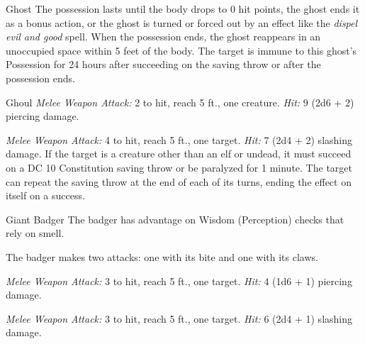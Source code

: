 \documentclass[10pt,a4paper,twoside,bg=print,twocolumn,openany,nodeprecatedcode]{dndbook}
\begin{document}
\begin{DndMonster}[float=t]{Ghost}
The possession lasts until the body drops to 0 hit points, the ghost ends it as a bonus action, or the ghost is turned or forced out by an effect like the \textit{dispel evil and good} spell. When the possession ends, the ghost reappears in an unoccupied space within 5 feet of the body. The target is immune to this ghost's Possession for 24 hours after succeeding on the saving throw or after the possession ends.

\end{DndMonster}



\begin{DndMonster}[float=t]{Ghoul}
\DndMonsterBasics[
armor-class = {12},
hit-points = {\DndDice{5d8}},
speed = {30 ft.}
]
\DndMonsterAbilityScores[
 str = 13,
 dex = 15,
 con = 10,
 int = 7,
 wis = 10,
 cha = 6
]
\DndMonsterDetails[
damage-immunities = {poison},
condition-immunities = {charmed, exhaustion, poisoned},
senses = {darkvision 60 ft., passive perception 10},
languages = {Common},
challenge = 1,
]
\textsl{Melee Weapon Attack:} 2 to hit, reach 5 ft., one creature. \textsl{Hit:} 9 (2d6 + 2) piercing damage.

\textsl{Melee Weapon Attack:} 4 to hit, reach 5 ft., one target. \textsl{Hit:} 7 (2d4 + 2) slashing damage. If the target is a creature other than an elf or undead, it must succeed on a DC 10 Constitution saving throw or be paralyzed for 1 minute. The target can repeat the saving throw at the end of each of its turns, ending the effect on itself on a success.

\end{DndMonster}



\begin{DndMonster}[float=t]{Giant Badger}
\DndMonsterBasics[
armor-class = {10},
hit-points = {\DndDice{2d8 + 4}},
speed = {30 ft., burrow 10 ft.}
]
\DndMonsterAbilityScores[
 str = 13,
 dex = 10,
 con = 15,
 int = 2,
 wis = 12,
 cha = 5
]
\DndMonsterDetails[
senses = {darkvision 30 ft., passive perception 11},
challenge = 1/4,
]
The badger has advantage on Wisdom (Perception) checks that rely on smell.

The badger makes two attacks: one with its bite and one with its claws.

\textsl{Melee Weapon Attack:} 3 to hit, reach 5 ft., one target. \textsl{Hit:} 4 (1d6 + 1) piercing damage.

\textsl{Melee Weapon Attack:} 3 to hit, reach 5 ft., one target. \textsl{Hit:} 6 (2d4 + 1) slashing damage.

\end{DndMonster}
\end{document}
